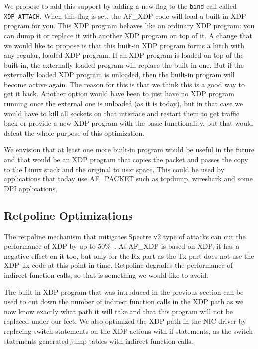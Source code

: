 \documentclass[9pt,numbers,reprint]{sigplanconf}
\begin{document}
We propose to add this support by adding a new flag to the {\tt bind} call
called {\tt XDP\_ATTACH}. When this flag is set, the AF\_XDP code will load a
built-in XDP program for you. This XDP program behaves like an
ordinary XDP program: you can dump it or replace it with
another XDP program on top of it. A change that we would like to
propose is that this built-in XDP program forms a hitch with any
regular, loaded XDP program. If an XDP program is loaded on top of the
built-in, the externally loaded program will replace the built-in
one. But if the externally loaded XDP program is unloaded, then the
built-in program will become active again. The reason for this is that
we think this is a good way to get it back. Another option would have
been to just have no XDP program running once the external one is
unloaded (as it is today), but in that case we would have to kill all
sockets on that interface and restart them to get traffic back or
provide a new XDP program with the basic functionality, but that would
defeat the whole purpose of this optimization.

We envision that at least one more built-in program would be useful
in the future and that would be an XDP program that copies the packet
and passes the copy to the Linux stack and the original to user
space. This could be used by applications that today use AF\_PACKET
such as tcpdump, wireshark and some DPI applications.


\subsection{Retpoline Optimizations}

The retpoline mechanism that mitigates Spectre v2 type of attacks can
cut the performance of XDP by up to
50\%~\cite{jesper_xdp_perf_drop}. As AF\_XDP is based on XDP, it has
a negative effect on it too, but only for the Rx part as the Tx part
does not use the XDP Tx code at this point in time. Retpoline degrades
the performance of indirect function calls, so that is something we
would like to avoid.

The built in XDP program that was introduced in the previous section
can be used to cut down the number of indirect function calls in the
XDP path as we now know exactly what path it will take and that this
program will not be replaced under our feet. We also optimized the XDP
path in the NIC driver by replacing switch statements on the
XDP actions with if statements, as the switch statements generated
jump tables with indirect function calls.
\end{document}
